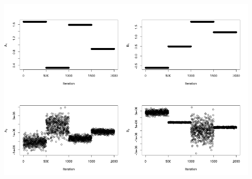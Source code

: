 \documentclass[12pt]{article}
\begin{document}
 \includegraphics[scale=0.5]{HyperParams2.png}
\end{document}

